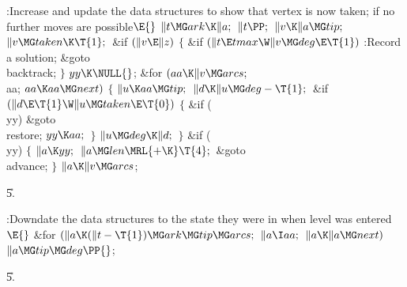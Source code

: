 \B{}:Increase  and update the data structures to show
that vertex  is now taken;  if no further
moves are possible\X${}\E{}$\6
$\|t\MG\\{ark}\K\|a;{}$\6
${}\|t\PP;{}$\6
${}\|v\K\|a\MG\\{tip};{}$\6
${}\|v\MG\\{taken}\K\T{1};{}$\6
\&{if} ${}(\|v\E\|z){}$\5
${}\{{}$\1\6
\&{if} ${}(\|t\E\\{tmax}\W\|v\MG\\{deg}\E\T{1}){}$\1\5
:Record a solution\X;\2\6
\&{goto} \\{backtrack};\6
\4${}\}{}$\2\6
${}\\{yy}\K\NULL{}$;\6
\&{for} ${}(\\{aa}\K\|v\MG\\{arcs};{}$ \\{aa}; ${}\\{aa}\K\\{aa}\MG\\{next}){}$%
\5
${}\{{}$\1\6
${}\|u\K\\{aa}\MG\\{tip};{}$\6
${}\|d\K\|u\MG\\{deg}-\T{1};{}$\6
\&{if} ${}(\|d\E\T{1}\W\|u\MG\\{taken}\E\T{0}){}$\5
${}\{{}$\1\6
\&{if} (\\{yy})\1\5
\&{goto} \\{restore};\2\6
${}\\{yy}\K\\{aa};{}$\6
\4${}\}{}$\2\6
${}\|u\MG\\{deg}\K\|d;{}$\6
\4${}\}{}$\2\6
\&{if} (\\{yy})\5
${}\{{}$\1\6
${}\|a\K\\{yy};{}$\6
${}\|a\MG\\{len}\MRL{+{\K}}\T{4};{}$\6
\&{goto} \\{advance};\6
\4${}\}{}$\2\6
${}\|a\K\|v\MG\\{arcs}{}$;\par
\U5.\fi

\B{}:Downdate the data structures to the state they were in
when level  was entered\X${}\E{}$\6
\&{for} ${}(\|a\K(\|t-\T{1})\MG\\{ark}\MG\\{tip}\MG\\{arcs};{}$ ${}\|a\I%
\\{aa};{}$ ${}\|a\K\|a\MG\\{next}){}$\1\5
${}\|a\MG\\{tip}\MG\\{deg}\PP{}$;\2\par
\U5.\fi

